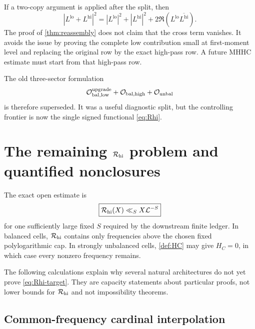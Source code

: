 \begin{warning}\label{fire:mixed}
If a two-copy argument is applied after the split, then
\[
 |L^{\mathrm{lo}}+L^{\mathrm{hi}}|^2
 =|L^{\mathrm{lo}}|^2+|L^{\mathrm{hi}}|^2
 +2\Re(L^{\mathrm{lo}}\overline{L^{\mathrm{hi}}}).
\]
The proof of \cref{thm:reassembly} does not claim that the cross term vanishes.
It avoids the issue by proving the complete low contribution small at
first-moment level and replacing the original row by the exact high-pass row.
A future MHHC estimate must start from that high-pass row.
\end{warning}

The old three-sector formulation
\[
 \mathcal O_{\mathrm{bal,low}}^{\mathrm{upgrade}}
 +\mathcal O_{\mathrm{bal,high}}+\mathcal O_{\mathrm{unbal}}
\]
is therefore superseded.  It was a useful diagnostic split, but the controlling
frontier is now the single signed functional \cref{eq:Rhi}.

\section{The remaining $\mathcal R_{\mathrm{hi}}$ problem and quantified nonclosures}\label{sec:Rhi}

The exact open estimate is
\begin{equation}\label{eq:Rhi-target}
             \boxed{\mathcal R_{\mathrm{hi}}(X)\ll_S X\mathcal L^{-S}}
\end{equation}
for one sufficiently large fixed $S$ required by the downstream finite ledger.
In balanced cells, $\mathcal R_{\mathrm{hi}}$ contains only frequencies above the chosen fixed
polylogarithmic cap.  In strongly unbalanced cells, \cref{def:HC} may give
$H_C=0$, in which case every nonzero frequency remains.

The following calculations explain why several natural architectures do not
yet prove \cref{eq:Rhi-target}.  They are capacity statements about particular
proofs, not lower bounds for $\mathcal R_{\mathrm{hi}}$ and not impossibility theorems.

\subsection{Common-frequency cardinal interpolation}

